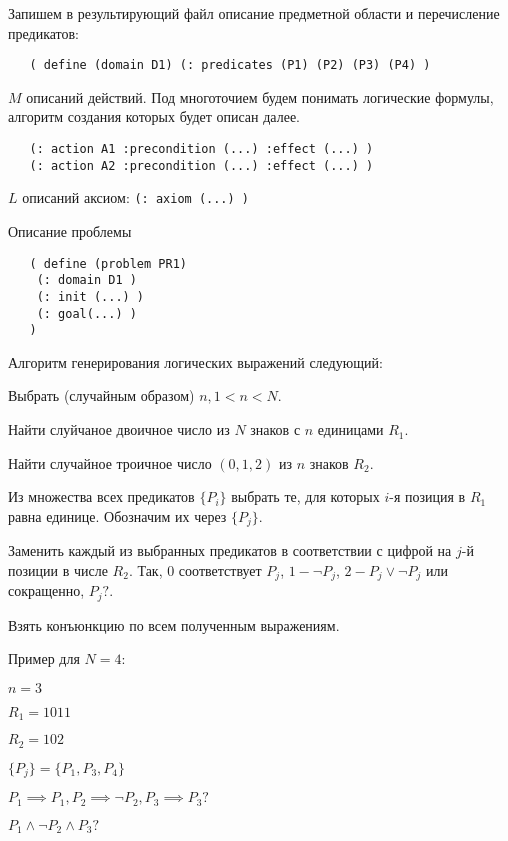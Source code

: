 \begin{enumerate*}
\item
  Запишем в результирующий файл описание предметной области и
  перечисление
  предикатов:
  \begin{verbatim}
   ( define (domain D1) (: predicates (P1) (P2) (P3) (P4) )
  \end{verbatim}

\item
  $M$ описаний действий. Под многоточием будем понимать логические
  формулы, алгоритм создания которых будет описан далее.
  \begin{verbatim}
   (: action A1 :precondition (...) :effect (...) )
   (: action A2 :precondition (...) :effect (...) )
  \end{verbatim}
  
\item
  $L$ описаний аксиом: \texttt{(: axiom (...) )}
\item
  Описание проблемы
  \begin{verbatim}   
   ( define (problem PR1)
    (: domain D1 )
    (: init (...) )
    (: goal(...) )
   )
  \end{verbatim}
\end{enumerate*}

Алгоритм генерирования логических выражений следующий:

\begin{enumerate*}
\item
  Выбрать (случайным образом) $n, 1 < n < N$.
\item
  Найти слуйчаное двоичное число из $N$ знаков с $n$ единицами $R_1$.
\item
  Найти случайное троичное число $(0, 1, 2)$ из $n$ знаков $R_2$.
\item
  Из множества всех предикатов $\{P_i\}$ выбрать те, для которых $i$-я
  позиция в $R_1$ равна единице. Обозначим их через $\{P_j\}$.
\item
  Заменить каждый из выбранных предикатов в соответствии с цифрой на
  $j$-й позиции в числе $R_2$. Так, $0$ соответствует $P_j$,
  $1 - \neg P_j$, $2 - P_j \vee \neg P_j$ или сокращенно, $P_j?$.
\item
  Взять конъюнкцию по всем полученным выражениям.
\end{enumerate*}

Пример для $N=4$:

\begin{enumerate*}
 \item $n=3$
 \item $R_1=1011$
 \item $R_2=102$
 \item $\{P_j\}=\{P_1, P_3, P_4\}$
 \item $P_1 \implies P_1, P_2 \implies \neg P_2, P_3 \implies P_3?$
 \item $P_1 \wedge \neg P_2 \wedge P_3?$
\end{enumerate*}


